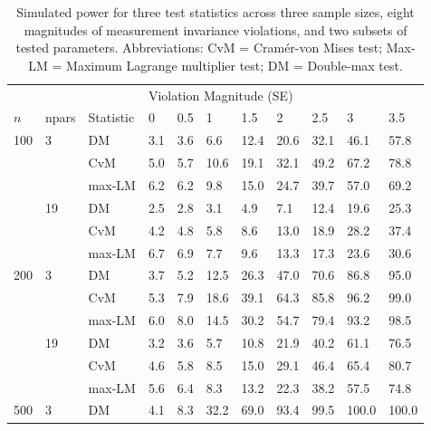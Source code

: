 \documentclass[man]{apa}
\begin{document}
\begin{table}
\caption{Simulated power for three test statistics
  across three sample sizes, eight magnitudes of measurement
  invariance violations, and two subsets of tested
  parameters. Abbreviations: CvM = Cram\'{e}r-von Mises 
  test; Max-LM = Maximum Lagrange multiplier test; DM = Double-max test.}
\label{tab:simres}
\begin{center}
\begin{tabular}{lllllllllll}
  \hline
   & & & \multicolumn{8}{l}{Violation Magnitude (SE)} \\
  $n$ &  npars &  Statistic    &  0 & 0.5 &    1 &  1.5
       &    2 &  2.5  &   3 &  3.5 \\ 
  \hline
  100  &  3    &  DM           &  3.1 &    3.6 &    6.6 &   12.4 &   20.6 &   32.1  &  46.1 &   57.8 \\ 
         &         &  CvM            &  5.0 &    5.7 &   10.6 &   19.1 &   32.1 &   49.2  &  67.2 &   78.8 \\ 
         &         &  max-LM          &  6.2 &    6.2 &    9.8 &   15.0 &   24.7 &   39.7  &  57.0 &   69.2 \\ 
         &  19   &  DM           &  2.5 &    2.8 &    3.1 &    4.9 &    7.1 &   12.4  &  19.6 &   25.3 \\ 
         &         &  CvM            &  4.2 &    4.8 &    5.8 &    8.6 &   13.0 &   18.9  &  28.2 &   37.4 \\ 
         &         &  max-LM          &  6.7 &    6.9 &    7.7 &    9.6 &   13.3 &   17.3  &  23.6 &   30.6 \\ 
  200  &  3    &  DM           &  3.7 &    5.2 &   12.5 &   26.3 &   47.0 &   70.6  &  86.8 &   95.0 \\ 
         &         &  CvM            &  5.3 &    7.9 &   18.6 &   39.1 &   64.3 &   85.8  &  96.2 &   99.0 \\ 
         &         &  max-LM          &  6.0 &    8.0 &   14.5 &   30.2 &   54.7 &   79.4  &  93.2 &   98.5 \\ 
         &  19   &  DM           &  3.2 &    3.6 &    5.7 &   10.8 &   21.9 &   40.2  &  61.1 &   76.5 \\ 
         &         &  CvM            &  4.6 &    5.8 &    8.5 &   15.0 &   29.1 &   46.4  &  65.4 &   80.7 \\ 
         &         &  max-LM          &  5.6 &    6.4 &    8.3 &   13.2 &   22.3 &   38.2  &  57.5 &   74.8 \\ 
  500  &  3    &  DM           &  4.1 &    8.3 &   32.2 &   69.0 &   93.4 &   99.5  & 100.0 &  100.0 \\ 

\end{tabular}
\end{center}
\end{table}
\end{document}
